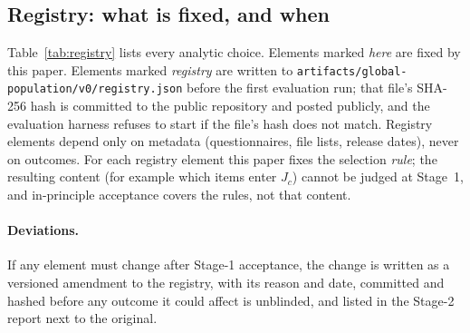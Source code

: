 \documentclass[10pt]{article}
\begin{document}
\subsection{Registry: what is fixed, and when}
\label{sec:registry}

Table~\ref{tab:registry} lists every analytic choice. Elements marked \emph{here} are fixed by this paper. Elements marked \emph{registry} are written to \nolinkurl{artifacts/global-population/v0/registry.json} before the first evaluation run; that file's SHA-256 hash is committed to the public repository and posted publicly, and the evaluation harness refuses to start if the file's hash does not match. Registry elements depend only on metadata (questionnaires, file lists, release dates), never on outcomes. For each registry element this paper fixes the selection \emph{rule}; the resulting content (for example which items enter $J_c$) cannot be judged at Stage~1, and in-principle acceptance covers the rules, not that content.

\paragraph{Deviations.} If any element must change after Stage-1 acceptance, the change is written as a versioned amendment to the registry, with its reason and date, committed and hashed before any outcome it could affect is unblinded, and listed in the Stage-2 report next to the original.
\end{document}
